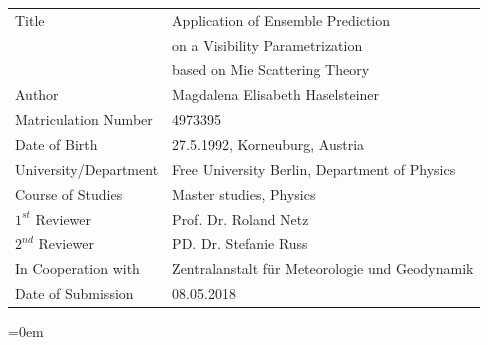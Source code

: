 \documentclass[12pt]{report}
\begin{document}
\begin{titlepage}
\begin{minipage}[B]{0.5\textwidth }
	         \end{minipage}
     
\pagebreak

	\begin{tabular}{l l}
	        Title & Application of Ensemble Prediction\\[-0.1cm]
	            &  on a Visibility Parametrization \\[-0.1cm]
	            & based on Mie Scattering Theory\\[0.3cm]
		    Author &  Magdalena Elisabeth Haselsteiner\\
		    Matriculation Number & 4973395\\
		    Date of Birth & 27.5.1992, Korneuburg, Austria\\
		    University/Department & Free University Berlin, Department of Physics\\
		    Course of Studies & Master studies, Physics\\
		    $1^{st}$ Reviewer & Prof. Dr. Roland Netz\\
		    $2^{nd}$ Reviewer & PD. Dr. Stefanie Russ\\
		    In Cooperation with & Zentralanstalt für Meteorologie und Geodynamik\\
		    Date of Submission & 08.05.2018 \\
		\end{tabular}
\end{titlepage}

\newpage
{\parskip=0em
\tableofcontents}
\newpage
\listoffigures
\newpage
{}











\newpage\printbibliography[heading=bibintoc,
title={Bibliography}
]
\newpage

\newpage

\newpage
\appendix

\setlength{\bibitemsep}{1em}
\end{document}
